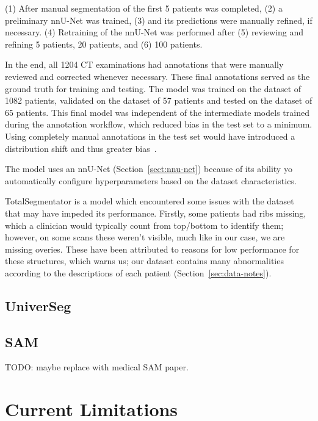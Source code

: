 \documentclass[11pt,twoside]{report}
\begin{document}
(1) After manual segmentation of the first 5 patients was completed, (2) a preliminary nnU-Net was trained, (3) and its predictions were manually refined, if necessary. (4) Retraining of the nnU-Net was performed after (5) reviewing and refining 5 patients, 20 patients, and (6) 100 patients.

In the end, all 1204 CT examinations had annotations that were manually reviewed and corrected whenever necessary. These final annotations served as the ground truth for training and testing. The model was trained on the dataset of 1082 patients, validated on the dataset of 57 patients and tested on the dataset of 65 patients. This final model was independent of the intermediate models trained during the annotation workflow, which reduced bias in the test set to a minimum. Using completely manual annotations in the test set would have introduced a distribution shift and thus greater bias~\cite{totalsegmentor-paper}.

The model uses an nnU-Net (Section~\ref{sect:nnu-net}) because of its ability yo automatically configure hyperparameters based on the dataset characteristics. 

TotalSegmentator is a model which encountered some issues with the dataset that may have impeded its performance. Firstly, some patients had ribs missing, which a clinician would typically count from top/bottom to identify them; however, on some scans these weren't visible, much like in our case, we are missing overies. These have been attributed to reasons for low performance for these structures, which warns us; our dataset contains many abnormalities according to the descriptions of each patient (Section~\ref{sec:data-notes}).

\subsection{UniverSeg}\label{sect:universeg}



\subsection{SAM}\label{sect:sam}

TODO: maybe replace with medical SAM paper.

\section{Current Limitations}\label{sect:limitations}
\end{document}
